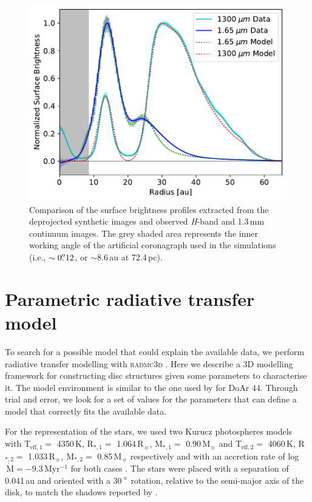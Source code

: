 \documentclass[letters,usenatbib,times]{mnras}
\begin{document}
\begin{figure}
	\includegraphics[width=\columnwidth]{comp_fig_all_profiles_au.pdf}
    \caption{Comparison of the surface brightness profiles extracted from the deprojected synthetic images and observed \textit{H}-band and 1.3\,mm continuum images. The grey shaded area represents the inner working angle of the artificial coronagraph used in the simulations (i.e., $\sim0\hbox{$.\!\!^{\prime\prime}$} 12$, or $\sim$8.6\,au at 72.4\,pc).}
    \label{fig:radprofiles}
\end{figure}

\section{Parametric radiative transfer model} \label{sec:model}

To search for a possible model that could explain the available data, we perform radiative transfer modelling with \textsc{radmc3d} \citep{Dullemond_2012}. Here we describe a 3D modelling framework for constructing disc structures given some parameters to characterise it. The model environment is similar to the one used by \citet{2018MNRAS.477.5104C} for DoAr 44. Through trial and error, we look for a set of values for the parameters that can define a model that correctly fits the available data.

For the representation of the stars, we used two Kurucz photospheres models \citep{1979ApJS...40....1K, 1997A&A...318..841C} with T$_{\mathrm{eff},1} =$ 4350\,K, R$_{*,1} =$ 1.064\,R$_{\sun}$, M$_{*,1} =$ 0.90\,M$_{\sun}$ and T$_{\mathrm{eff},2} =$ 4060\,K, R$_{*,2} =$ 1.033\,R$_{\sun}$, M$_{*,2} =$ 0.85\,M$_{\sun}$ respectively and with an accretion rate of log$\,\dot{\mathrm{M}} = -$9.3\,Myr$^{-1}$ for both cases \citep{10.1111/j.1365-2966.2011.19366.x}. The stars were placed with a separation of 0.041\,au and oriented with a 30\,$\hbox{$^\circ$}$ rotation, relative to the semi-major axis of the disk, to match the shadows reported by \citet{dOrazi}.
\end{document}
